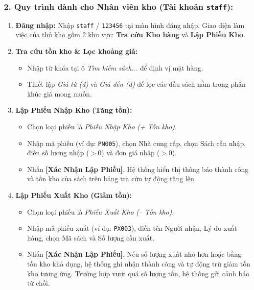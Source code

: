 \documentclass[12pt,a4paper]{article}
\begin{document}
\subsubsection*{2. Quy trình dành cho Nhân viên kho (Tài khoản \texttt{staff}):}
\begin{enumerate}
    \item \textbf{Đăng nhập:} Nhập \texttt{staff} / \texttt{123456} tại màn hình đăng nhập. Giao diện làm việc của thủ kho gồm 2 khu vực: \textbf{Tra cứu Kho hàng} và \textbf{Lập Phiếu Kho}.
    \item \textbf{Tra cứu tồn kho \& Lọc khoảng giá:} 
    \begin{itemize}
        \item Nhập từ khóa tại ô \textit{Tìm kiếm sách...} để định vị mặt hàng.
        \item Thiết lập \textit{Giá từ (đ)} và \textit{Giá đến (đ)} để lọc các đầu sách nằm trong phân khúc giá mong muốn.
    \end{itemize}
    \item \textbf{Lập Phiếu Nhập Kho (Tăng tồn):}
    \begin{itemize}
        \item Chọn loại phiếu là \textit{Phiếu Nhập Kho (+ Tồn kho)}.
        \item Nhập mã phiếu (ví dụ: \texttt{PN005}), chọn Nhà cung cấp, chọn Sách cần nhập, điền số lượng nhập ($>0$) và đơn giá nhập ($>0$).
        \item Nhấn \textbf{[Xác Nhận Lập Phiếu]}. Hệ thống hiển thị thông báo thành công và tồn kho của sách trên bảng tra cứu tự động tăng lên.
    \end{itemize}
    \item \textbf{Lập Phiếu Xuất Kho (Giảm tồn):}
    \begin{itemize}
        \item Chọn loại phiếu là \textit{Phiếu Xuất Kho (-- Tồn kho)}.
        \item Nhập mã phiếu xuất (ví dụ: \texttt{PX003}), điền tên Người nhận, Lý do xuất hàng, chọn Mã sách và Số lượng cần xuất.
        \item Nhấn \textbf{[Xác Nhận Lập Phiếu]}. Nếu số lượng xuất nhỏ hơn hoặc bằng tồn kho khả dụng, hệ thống ghi nhận thành công và tự động trừ giảm tồn kho tương ứng. Trường hợp vượt quá số lượng tồn, hệ thống gửi cảnh báo từ chối.
    \end{itemize}
\end{enumerate}
\end{document}
